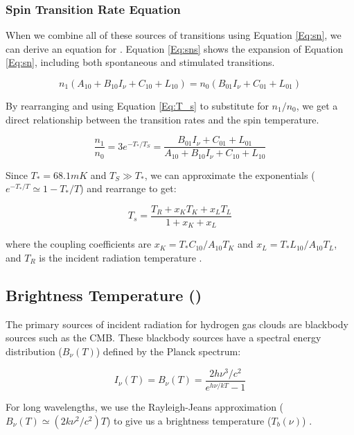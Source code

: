 \subsubsection{Spin Transition Rate Equation}
When we combine all of these sources of transitions using Equation \ref{Eq:sn}, we can derive an equation for \ts. Equation \ref{Eq:sns} shows the expansion of Equation \ref{Eq:sn}, including both spontaneous and stimulated transitions. 

\begin{equation}\label{Eq:sns}
n_1(A_{10} + B_{10} I_\nu + C_{10} + L_{10}) = n_0 (B_{01} I_\nu + C_{01} + L_{01})
\end{equation}

By rearranging and using Equation \ref{Eq:T_s} to substitute for $n_1/n_0$, we get a direct relationship between the transition rates and the spin temperature. 

\begin{equation}
\frac{n_1}{n_0} = 3 e^{-T_*/T_S} = \frac{B_{01} I_\nu + C_{01}+ L_{01}}{A_{10}+ B_{10} I_\nu + C_{10} +L_{10}}
\end{equation}

Since $T_* = 68.1 mK$ and $T_S \gg T_*$, we can approximate the exponentials ($e^{-T_*/T} \simeq 1-T_*/T$) and rearrange to get:

\begin{equation}\label{Eq:dT_s}
T_s = \frac{T_{R} + x_K T_{K} + x_{L} T_{L}}{1+x_K +x_{L}}
\end{equation}

where the coupling coefficients are $x_K = T_* C_{10}/A_{10} T_K$ and $x_L = T_* L_{10} / A_{10} T_L$, and $T_R$ is the incident radiation temperature \cite{field_1958}.

\subsection{Brightness Temperature (\tb)}
The primary sources of incident radiation for hydrogen gas clouds are blackbody sources such as the CMB. These blackbody sources have a spectral energy distribution ($B_\nu (T)$) defined by the Planck spectrum:

\begin{equation}
I_{\nu} (T) = B_{\nu}(T) = \frac{ 2 h \nu^3 / c^2}{e^{h \nu / k T}-1}
\end{equation}

For long wavelengths, we use the Rayleigh-Jeans approximation ($B_{\nu} (T) \simeq (2 k \nu^2 / c^2) T$) to give us a brightness temperature ($T_b (\nu)$) \cite{carroll2007}. 

